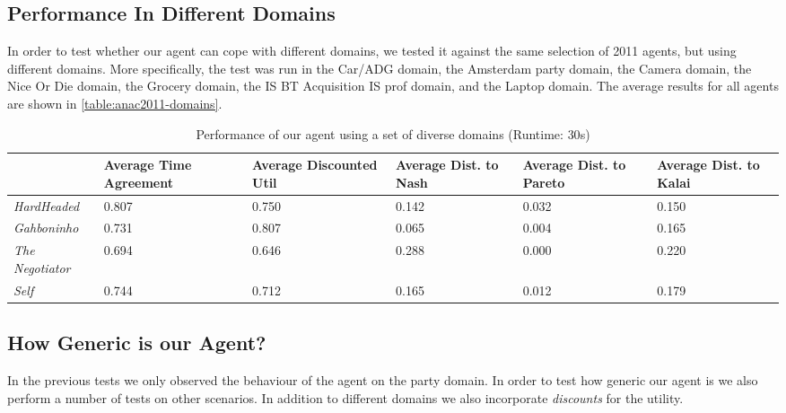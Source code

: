 \subsection{Performance In Different Domains}
In order to test whether our agent can cope with different domains, we tested it against the same selection of 2011 agents, but using different domains. More specifically, the test was run in the Car/ADG domain, the Amsterdam party domain, the Camera domain, the Nice Or Die domain, the Grocery domain, the IS BT Acquisition IS prof domain, and the Laptop domain. The average results for all agents are shown in \autoref{table:anac2011-domains}.
\begin{table}[H]
  \centering
  \small
  \begin{tabular}{l|p{2cm}|p{2cm}|p{2cm}|p{2cm}|p{2cm}|}
    ~                     & Average Time Agreement & Average Discounted Util & Average Dist. to Nash & Average Dist. to Pareto & Average Dist. to Kalai \\
    \hline
    \emph{HardHeaded}     & 0.807 & 0.750 & 0.142 & 0.032 & 0.150 \\ \hline
    \emph{Gahboninho}     & 0.731 & 0.807 & 0.065 & 0.004 & 0.165 \\ \hline
    \emph{The Negotiator} & 0.694 & 0.646 & 0.288 & 0.000 & 0.220 \\ \hline
    \emph{Self}           & 0.744 & 0.712 & 0.165 & 0.012 & 0.179 \\ \hline
  \end{tabular}
 \caption{Performance of our agent using a set of diverse domains (Runtime: $30$s) \label{table:anac2011-domains}}
\end{table}



\subsection{How Generic is our Agent?}

In the previous tests we only observed the behaviour of the agent on the party domain. In order to test how generic our agent is we also perform a number of tests on other scenarios. In addition to different domains we also incorporate \emph{discounts} for the utility. \\


